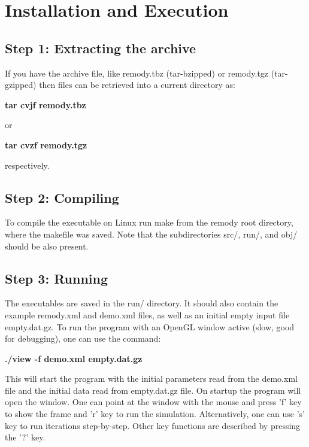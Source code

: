  \hypertarget{index_SecInstall}{}\section{Installation and Execution}\label{index_SecInstall}
\hypertarget{index_step1}{}\subsection{Step 1: Extracting the archive}\label{index_step1}
If you have the archive file, like remody.tbz (tar-bzipped) or remody.tgz (tar-gzipped) then files can be retrieved into a current directory as: \par
\par
{\bf  tar cvjf remody.tbz \par
\par
} or \par
\par
{\bf  tar cvzf remody.tgz \par
\par
} respectively.\hypertarget{index_step2}{}\subsection{Step 2: Compiling}\label{index_step2}
To compile the executable on Linux run make from the remody root directory, where the makefile was saved. Note that the subdirectories src/, run/, and obj/ should be also present.\hypertarget{index_step3}{}\subsection{Step 3: Running}\label{index_step3}
The executables are saved in the run/ directory. It should also contain the example remody.xml and demo.xml files, as well as an initial empty input file empty.dat.gz. To run the program with an OpenGL window active (slow, good for debugging), one can use the command: \par
\par
{\bf  ./view -f demo.xml empty.dat.gz }\par
\par
 This will start the program with the initial parameters read from the demo.xml file and the initial data read from empty.dat.gz file. On startup the program will open the window. One can point at the window with the mouse and press 'f' key to show the frame and 'r' key to run the simulation. Alternatively, one can use 's' key to run iterations step-by-step. Other key functions are described by pressing the '?' key.

